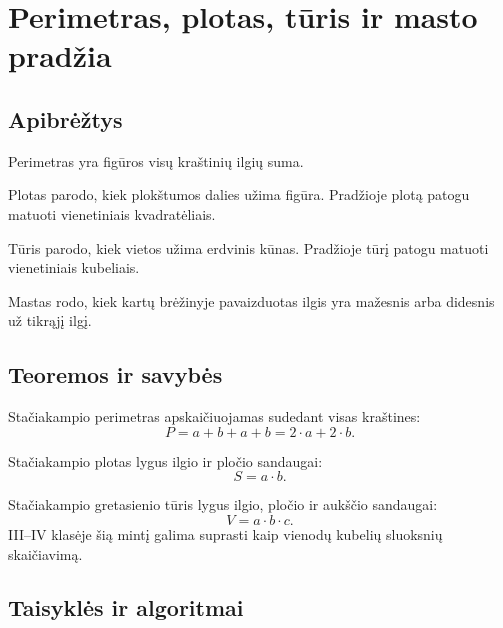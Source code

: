 \section{Perimetras, plotas, tūris ir masto pradžia}\label{sec:perimetras-plotas-turis-ir-masto-pradzia}

\subsection{Apibrėžtys}

\begin{apibreztis}
Perimetras yra figūros visų kraštinių ilgių suma.
\end{apibreztis}

\begin{apibreztis}
Plotas parodo, kiek plokštumos dalies užima figūra. Pradžioje plotą patogu matuoti vienetiniais kvadratėliais.
\end{apibreztis}

\begin{apibreztis}
Tūris parodo, kiek vietos užima erdvinis kūnas. Pradžioje tūrį patogu matuoti vienetiniais kubeliais.
\end{apibreztis}

\begin{apibreztis}
Mastas rodo, kiek kartų brėžinyje pavaizduotas ilgis yra mažesnis arba didesnis už tikrąjį ilgį.
\end{apibreztis}

\subsection{Teoremos ir savybės}

\begin{savybe}
Stačiakampio perimetras apskaičiuojamas sudedant visas kraštines:
\[
P=a+b+a+b=2\cdot a+2\cdot b.
\]
\end{savybe}

\begin{savybe}
Stačiakampio plotas lygus ilgio ir pločio sandaugai:
\[
S=a\cdot b.
\]
\end{savybe}

\begin{savybe}
Stačiakampio gretasienio tūris lygus ilgio, pločio ir aukščio sandaugai:
\[
V=a\cdot b\cdot c.
\]
III--IV klasėje šią mintį galima suprasti kaip vienodų kubelių sluoksnių skaičiavimą.
\end{savybe}

\subsection{Taisyklės ir algoritmai}

